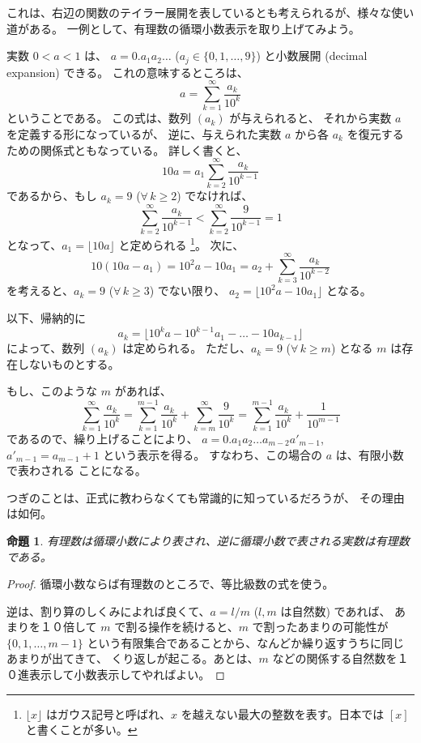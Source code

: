 \documentclass[a4paper]{jsarticle}
\newtheorem{Proposition}[Theorem]{命題}
\theoremstyle{definition}
\theoremstyle{remark}
\begin{document}
これは、右辺の関数のテイラー展開を表しているとも考えられるが、様々な使い道がある。
一例として、有理数の循環小数表示を取り上げてみよう。


実数 $0 < a < 1$ は、
$a = 0.a_1a_2\dots$ 
($a_j \in \{ 0,1,\dots,9 \}$) と小数展開 (decimal expansion) できる。
これの意味するところは、
\[
a = \sum_{k=1}^\infty \frac{a_k}{10^k}
\]
ということである。
この式は、数列 $(a_k)$ が与えられると、
それから実数 $a$ を定義する形になっているが、
逆に、与えられた実数 $a$ から各 $a_k$ を復元する
ための関係式ともなっている。
詳しく書くと、
\[
10a = a_1 \sum_{k=2}^\infty 
\frac{a_k}{10^{k-1}}
\]
であるから、もし $a_k = 9$ ($\forall\,k \geq 2$) 
でなければ、
\[
\sum_{k=2}^\infty \frac{a_k}{10^{k-1}} 
< \sum_{k=2}^\infty \frac{9}{10^{k-1}} 
= 1
\]
となって、$a_1 = \lfloor 10a \rfloor$ と定められる
\footnote{
$\lfloor x \rfloor$ はガウス記号と呼ばれ、$x$ を越えない最大の整数を表す。日本では $[x]$ と書くことが多い。}。
次に、
\[
10(10a - a_1) = 10^2a - 10 a_1 = 
a_2 + \sum_{k=3}^\infty \frac{a_k}{10^{k-2}} 
\]
を考えると、$a_k = 9$ ($\forall\, k \geq 3$) でない限り、
$a_2 = \lfloor 10^2a - 10a_1 \rfloor$ となる。

以下、帰納的に
\[
a_k = \lfloor 10^ka - 10^{k-1}a_1 - \dots - 10 a_{k-1} \rfloor
\]
によって、数列 $(a_k)$ は定められる。
ただし、$a_k = 9$ ($\forall\, k \geq m$) となる
$m$ は存在しないものとする。

もし、このような $m$ があれば、
\[
\sum_{k=1}^\infty \frac{a_k}{10^k} 
= \sum_{k=1}^{m-1} \frac{a_k}{10^k} 
+ \sum_{k=m}^\infty \frac{9}{10^k} 
= \sum_{k=1}^{m-1} \frac{a_k}{10^k} 
+ \frac{1}{10^{m-1}}
\]
であるので、繰り上げることにより、
$a = 0.a_1a_2\dots a_{m-2} a'_{m-1}$, 
$a'_{m-1} = a_{m-1} + 1$ という表示を得る。
すなわち、この場合の $a$ は、有限小数で表わされる
ことになる。

つぎのことは、正式に教わらなくても常識的に知っているだろうが、
その理由は如何。

\begin{Proposition}
有理数は循環小数により表され、逆に循環小数で表される実数は有理数である。
\end{Proposition}

\begin{proof}
循環小数ならば有理数のところで、等比級数の式を使う。

逆は、割り算のしくみによれば良くて、$a = l/m$ ($l, m$ は自然数) であれば、
あまりを１０倍して $m$ で割る操作を続けると、$m$ で割ったあまりの可能性が 
$\{ 0, 1, \dots, m-1\}$ という有限集合であることから、なんどか繰り返すうちに同じあまりが出てきて、
くり返しが起こる。あとは、$m$ などの関係する自然数を１０進表示して小数表示してやればよい。
\end{proof} 
\end{document}
